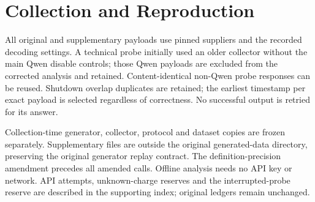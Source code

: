 \documentclass[acmlarge,anonymous,review,nonacm]{acmart}
\begin{document}
\section{Collection and Reproduction}
All original and supplementary payloads use pinned suppliers and the recorded decoding settings. A technical probe initially used an older collector without the main Qwen disable controls; those Qwen payloads are excluded from the corrected analysis and retained. Content-identical non-Qwen probe responses can be reused. Shutdown overlap duplicates are retained; the earliest timestamp per exact payload is selected regardless of correctness. No successful output is retried for its answer.

Collection-time generator, collector, protocol and dataset copies are frozen separately. Supplementary files are outside the original generated-data directory, preserving the original generator replay contract. The definition-precision amendment precedes all amended calls. Offline analysis needs no API key or network. API attempts, unknown-charge reserves and the interrupted-probe reserve are described in the supporting index; original ledgers remain unchanged.
\end{document}

